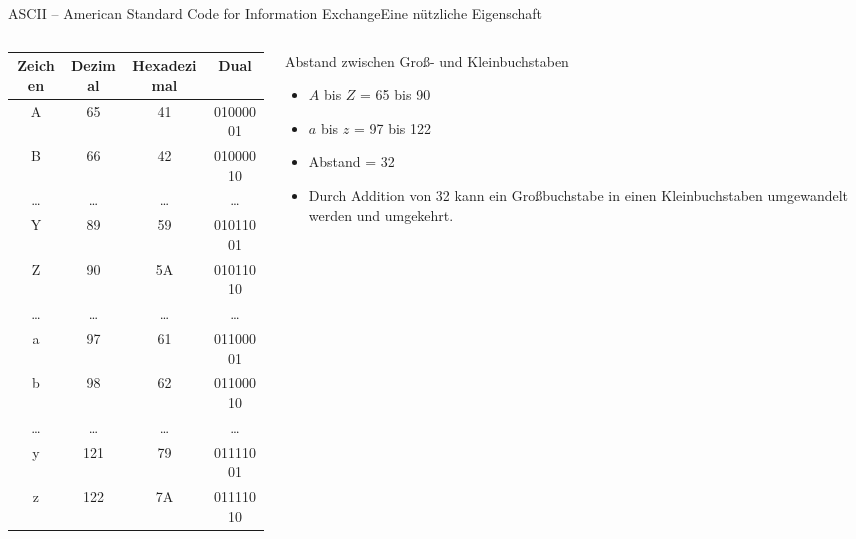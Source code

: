 \documentclass[xelatex,aspectratio=169]{beamer}
\begin{document}
\begin{frame}[allowframebreaks]{ASCII -- American Standard Code for Information Exchange}{Eine nützliche Eigenschaft}
    \begin{columns}
        \begin{column}{0.5\textwidth}
            \begin{tabular}{cccc}
                \toprule
                Zeichen & Dezimal & Hexadezimal & Dual     \\
                \midrule
                A       & 65      & 41          & 01000001 \\
                B       & 66      & 42          & 01000010 \\
                \ldots  & \ldots  & \ldots      & \ldots   \\
                Y       & 89      & 59          & 01011001 \\
                Z       & 90      & 5A          & 01011010 \\
                \ldots  & \ldots  & \ldots      & \ldots   \\
                a       & 97      & 61          & 01100001 \\
                b       & 98      & 62          & 01100010 \\
                \ldots  & \ldots  & \ldots      & \ldots   \\
                y       & 121     & 79          & 01111001 \\
                z       & 122     & 7A          & 01111010 \\
                \bottomrule
            \end{tabular}
        \end{column}
        \begin{column}{0.5\textwidth}
            \begin{block}{Abstand zwischen Groß- und Kleinbuchstaben}
                \begin{itemize}
                    \item $A$ bis $Z$ = 65 bis 90
                    \item $a$ bis $z$ = 97 bis 122
                    \item Abstand = 32
                    \item Durch Addition von 32 kann ein Großbuchstabe in einen Kleinbuchstaben umgewandelt werden und umgekehrt.
                \end{itemize}
            \end{block}
        \end{column}
    \end{columns}
\end{frame}

\end{document}
